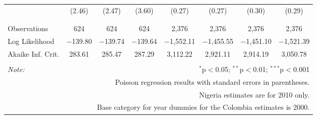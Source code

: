 \begin{table}[!htbp]
\begin{tabular}{@{\extracolsep{-6pt}}lccccccc}
  & (2.46) & (2.47) & (3.60) & (0.27) & (0.27) & (0.30) & (0.29) \\ 
  & & & & & & & \\ 
\hline \\[-1.8ex] 
Observations & 624 & 624 & 624 & 2,376 & 2,376 & 2,376 & 2,376 \\ 
Log Likelihood & $-$139.80 & $-$139.74 & $-$139.64 & $-$1,552.11 & $-$1,455.55 & $-$1,451.10 & $-$1,521.39 \\ 
Akaike Inf. Crit. & 283.61 & 285.47 & 287.29 & 3,112.22 & 2,921.11 & 2,914.19 & 3,050.78 \\ 
\hline 
\hline \\[-1.8ex] 
\textit{Note:}  & \multicolumn{7}{r}{$^{*}$p$<$0.05; $^{**}$p$<$0.01; $^{***}$p$<$0.001} \\ 
 & \multicolumn{7}{r}{Poisson regression results with standard errors in parentheses.} \\ 
 & \multicolumn{7}{r}{Nigeria estimates are for 2010 only.} \\ 
 & \multicolumn{7}{r}{Base category for year dummies  for the Colombia estimates is 2000.} \\ 
\end{tabular} 
\end{table} 
